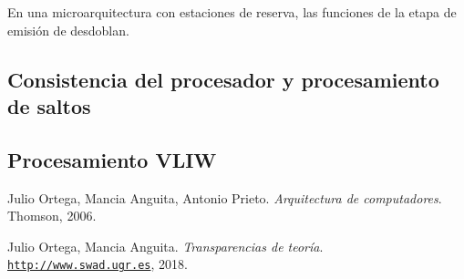 \documentclass[12pt,spanish]{article}
\begin{document}
En una microarquitectura con estaciones de reserva, las funciones de la etapa de emisión de desdoblan.

\subsection{Consistencia del procesador y procesamiento de saltos}


\subsection{Procesamiento VLIW}


\begin{thebibliography}{9}

Julio Ortega, Mancia Anguita, Antonio Prieto. 
\textit{Arquitectura de computadores}. 
Thomson, 2006.
 
Julio Ortega, Mancia Anguita. 
\textit{Transparencias de teoría}. \\
\texttt{\url{http://www.swad.ugr.es}}, 2018.

\end{thebibliography}
\end{document}
